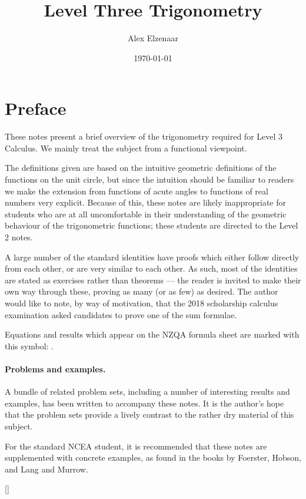 \documentclass[a4paper,leqno]{article}
\title{Level Three Trigonometry}
\author{Alex Elzenaar}
\date{\today}
\numberwithin{equation}{section}
\theoremstyle{definition}
\theoremstyle{remark}
\begin{document}
\maketitle
\tableofcontents
\section*{Preface}
These notes present a brief overview of the trigonometry required for Level 3 Calculus. We
mainly treat the subject from a functional viewpoint.

The definitions given are based on the intuitive geometric definitions of the functions on
the unit circle, but since the intuition should be familiar to readers we make the extension
from functions of acute angles to functions of real numbers very explicit. Because of this, these
notes are likely inappropriate for students who are at all uncomfortable in their understanding of
the geometric behaviour of the trigonometric functions; these students are directed to the
Level 2 notes.

A large number of the standard identities have proofs which either follow directly from each other,
or are very similar to each other. As such, most of the identities are stated as exercises rather
than theorems --- the reader is invited to make their own way through these, proving as many (or
as few) as desired. The author would like to note, by way of motivation, that the 2018 scholarship
calculus examination asked candidates to prove one of the sum formulae.

Equations and results which appear on the NZQA formula sheet are marked with this symbol: .

\paragraph{Problems and examples.}
A bundle of related problem sets, including a number of interesting results and examples, has been written
to accompany these notes. It is the author's hope that the problem sets provide a lively contrast to the
rather dry material of this subject.

For the standard NCEA student, it is recommended that these notes are supplemented with concrete examples,
as found in the books by Foerster, Hobson, and Lang and Murrow.

[{\titlerule[0.8pt]}]
\let\oldsection\section
\renewcommand\section{\clearpage\oldsection}
\end{document}
